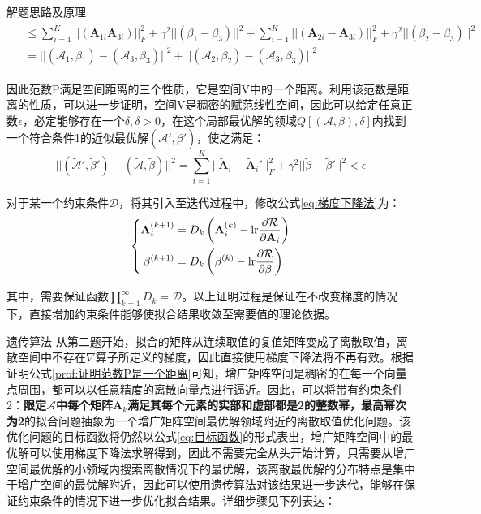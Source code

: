 \documentclass[11pt]{article}
\begin{document}
\begin{section}{解题思路及原理}
\begin{align}
\begin{aligned}
                                                           & \le\sum_{i=1}^{K}||(\mathbf{A}_{1i}\mathbf{A}_{3i})||_F^2+\gamma^2||(\beta_1-\beta_3)||^2+\sum_{i=1}^{K}||(\mathbf{A}_{2i}-\mathbf{A}_{3i})||_F^2+\gamma^2||(\beta_2-\beta_3)||^2 \\
                                                           & =||(\mathcal{A}_1,\beta_1)-(\mathcal{A}_3,\beta_3)||^2+||(\mathcal{A}_2,\beta_2)-(\mathcal{A}_3,\beta_3)||^2
   \end{aligned}
   \label{prof:证明范数P是一个距离}
 \end{align}\par
 因此范数P满足空间距离的三个性质，它是空间V中的一个距离。利用该范数是距离的性质，可以进一步证明\cite{__2012}，空间V是稠密的赋范线性空间，因此可以给定任意正数$\epsilon$，必定能够存在一个$\delta,\delta>0$，在这个局部最优解的领域$Q[(\mathcal{A},\beta),\delta]$内找到一个符合条件1的近似最优解$(\tilde{\mathcal{A}}',\tilde{\beta}')$，使之满足：
 \begin{equation}
   ||(\tilde{\mathcal{A}}',\tilde{\beta}')-(\tilde{ \mathcal{A}},\tilde{\beta})||^2=\sum_{i=1}^{K}||\tilde{\mathbf{A}}_i-\tilde{\mathbf{A}}_i'||_F^2+\gamma^2||\tilde{\beta}-\tilde{\beta}'||^2<\epsilon
   \label{eq:稠密性保证矩阵存在最优解的近似解}
 \end{equation}\par
 对于某一个约束条件$\mathcal{D}$，将其引入至迭代过程中，修改公式\ref{eq:梯度下降法}为：
 \begin{align}
   \left\{
   \begin{aligned}
     \mathbf{A}_i^{(k+1)} & =D_k\left(\mathbf{A}_i^{(k)}-\mathrm{lr}\frac{\partial{\mathcal{R}}}{\partial{\mathbf{A}_i}}\right) \\
     \beta^{(k+1)}        & =D_k\left(\beta^{(k)}-\mathrm{lr}\frac{\partial{\mathcal{R}}}{\partial{\beta}}\right)
   \end{aligned}
   \right.\label{eq:带约束条件的梯度下降法}
 \end{align}\par
 其中，需要保证函数$\prod_{k=1}^\infty D_k=\mathcal{D}$。以上证明过程是保证在不改变梯度的情况下，直接增加约束条件能够使拟合结果收敛至需要值的理论依据。
 \begin{subsection}{遗传算法}
   从第二题开始，拟合的矩阵从连续取值的复值矩阵变成了离散取值，离散空间中不存在$\nabla$算子所定义的梯度，因此直接使用梯度下降法将不再有效。根据证明公式\ref{prof:证明范数P是一个距离}可知，增广矩阵空间是稠密的在每一个向量点周围，都可以以任意精度的离散向量点进行逼近。因此，可以将带有约束条件2：\textbf{\songti 限定$\mathcal{A}$中每个矩阵$\mathbf{A}_k$满足其每个元素的实部和虚部都是2的整数幂，最高幂次为2}的拟合问题抽象为一个增广矩阵空间最优解领域附近的离散取值优化问题。该优化问题的目标函数将仍然以公式\ref{eq:目标函数}的形式表出，增广矩阵空间中的最优解可以使用梯度下降法求解得到，因此不需要完全从头开始计算，只需要从增广空间最优解的小领域内搜索离散情况下的最优解，该离散最优解的分布特点是集中于增广空间的最优解附近，因此可以使用遗传算法对该结果进一步迭代，能够在保证约束条件的情况下进一步优化拟合结果。详细步骤见下列表达：\par

\end{subsection}
\end{section}
\end{document}
